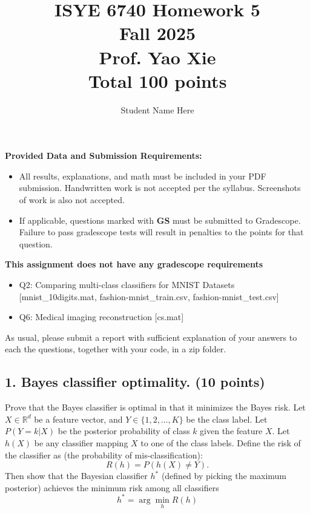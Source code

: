 \documentclass[twoside,10pt]{article}
\begin{document}
\title{ISYE 6740 Homework 5 \\ 
Fall 2025\\ 
Prof. Yao Xie\\
 Total 100 points}
 \author{Student Name Here}
\date{}
\maketitle



\textbf{Provided Data and Submission Requirements:}
\begin{itemize}[noitemsep]
    \item All results, explanations, and math must be included in your PDF submission. Handwritten work is not accepted per the syllabus. Screenshots of work is also not accepted.
    \item If applicable, questions marked with \textbf{GS} must be submitted to Gradescope. Failure to pass gradescope tests will result in penalties to the points for that question.
\end{itemize}

\textbf{This assignment does not have any gradescope requirements}

\begin{itemize}[noitemsep]
    \item Q2: Comparing multi-class classifiers for MNIST Datasets [mnist\_10digits.mat, fashion-mnist\_train.csv, fashion-mnist\_test.csv]
    \item Q6: Medical imaging reconstruction [cs.mat]
\end{itemize}
As usual, please submit a report with sufficient explanation of your answers to each the questions, together with your code, in a zip folder.

\subsection*{1. Bayes classifier optimality. (10 points)}

Prove that the Bayes classifier is optimal in that it minimizes the Bayes risk. 
%
Let $X\in \mathbb R^d$ be a feature vector, and $Y\in \{1, 2, \ldots, K\}$ be the class label. Let $P(Y = k|X)$ be the posterior probability of class $k$ given the feature $X$. Let $h(X)$ be any classifier mapping $X$ to one of the class labels. Define the risk of the classifier as (the probability of mis-classification): \[R(h) = P(h(X)\neq Y).\] Then show that the Bayesian classifier $h^*$ (defined by picking the maximum posterior) achieves the minimum risk among all classifiers
\[h^*=\arg\min_h R(h)\]
\end{document}
